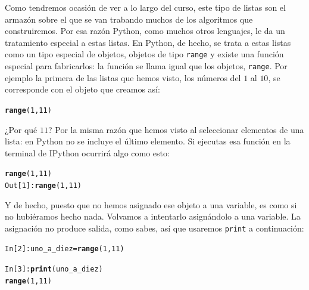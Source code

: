 \documentclass[10pt,a4paper]{article}\usepackage[]{graphicx}\usepackage[]{color}
\makeatletter
\newcommand{\hlnum}[1]{\textcolor[rgb]{0.686,0.059,0.569}{#1}}%
\newcommand{\hlopt}[1]{\textcolor[rgb]{0,0,0}{#1}}%
\newcommand{\hlstd}[1]{\textcolor[rgb]{0.345,0.345,0.345}{#1}}%
\newcommand{\hlkwb}[1]{\textcolor[rgb]{0.69,0.353,0.396}{#1}}%
\newcommand{\hlkwd}[1]{\textcolor[rgb]{0.737,0.353,0.396}{\textbf{#1}}}%
\newenvironment{kframe}{%
 \def\at@end@of@kframe{}%
 \ifinner\ifhmode%
  \def\at@end@of@kframe{\end{minipage}}%
  \begin{minipage}{\columnwidth}%
 \fi\fi%
 \def\FrameCommand##1{\hskip\@totalleftmargin \hskip-\fboxsep
 \colorbox{shadecolor}{##1}\hskip-\fboxsep
     \hskip-\linewidth \hskip-\@totalleftmargin \hskip\columnwidth}%
 \MakeFramed {\advance\hsize-\width
   \@totalleftmargin\z@ \linewidth\hsize
   \@setminipage}}%
 {\par\unskip\endMakeFramed%
 \at@end@of@kframe}
\newenvironment{knitrout}{}{} %
\newcounter {cont01}
\makeatother
\begin{document}
Como tendremos ocasión de ver a lo largo del curso, este tipo de listas son el armazón sobre el que se van trabando muchos de los algoritmos que construiremos. Por esa razón Python, como muchos otros lenguajes, le da un tratamiento especial a estas listas. En Python, de hecho, se trata a estas listas como un tipo especial de objetos, objetos de tipo {\tt range} y existe una función especial para fabricarlos: la función se llama igual que los objetos, {\tt range}. Por ejemplo la primera de las listas que hemos visto, los números del $1$ al $10$, se corresponde con el objeto que creamos así:
\begin{knitrout}
\color{fgcolor}\begin{kframe}
\begin{alltt}
\hlkwd{range}\hlstd{(}\hlnum{1}\hlstd{,} \hlnum{11}\hlstd{)}
\end{alltt}
\end{kframe}
\end{knitrout}
¿Por qué $11$? Por la misma razón que hemos visto al seleccionar elementos de una lista: en Python no se incluye el último elemento. Si ejecutas esa función en la terminal de IPython ocurrirá algo como esto:
\begin{knitrout}
\color{fgcolor}\begin{kframe}
\begin{alltt}
\hlkwd{range}\hlstd{(}\hlnum{1}\hlstd{,} \hlnum{11}\hlstd{)}
\hlstd{Out[}\hlnum{1}\hlstd{]}\hlopt{:} \hlkwd{range}\hlstd{(}\hlnum{1}\hlstd{,} \hlnum{11}\hlstd{)}
\end{alltt}
\end{kframe}
\end{knitrout}
Y de hecho, puesto que no hemos asignado ese objeto a una variable, es como si no hubiéramos hecho nada. Volvamos a intentarlo asignándolo a una variable. La asignación no produce salida, como sabes, así que usaremos {\tt print} a continuación:
\begin{knitrout}
\color{fgcolor}\begin{kframe}
\begin{alltt}
\hlstd{In [}\hlnum{2}\hlstd{]}\hlopt{:} \hlstd{uno_a_diez} \hlkwb{=} \hlkwd{range}\hlstd{(}\hlnum{1}\hlstd{,} \hlnum{11}\hlstd{)}

\hlstd{In [}\hlnum{3}\hlstd{]}\hlopt{:} \hlkwd{print}\hlstd{(uno_a_diez)}
\hlkwd{range}\hlstd{(}\hlnum{1}\hlstd{,} \hlnum{11}\hlstd{)}
\end{alltt}
\end{kframe}
\end{knitrout}
\end{document}

